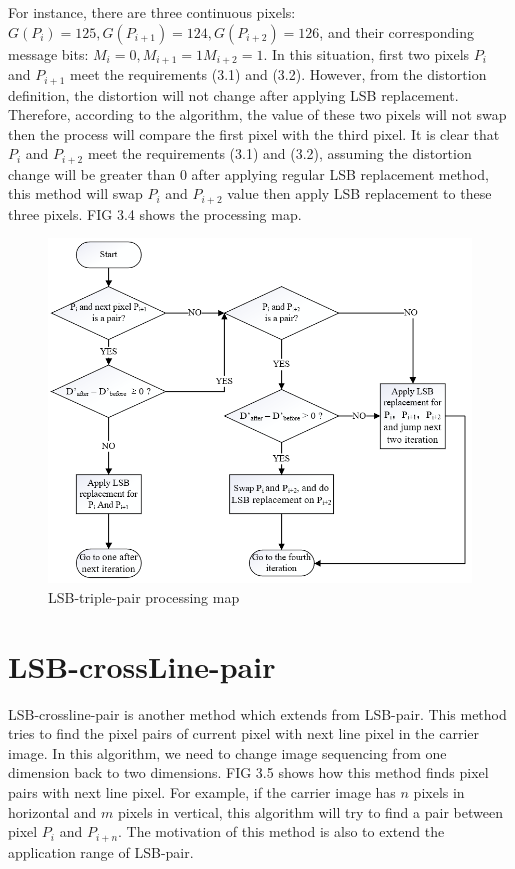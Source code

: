 For instance, there are three continuous pixels: \(G(P_{i}) = 125, G(P_{i+1}) = 124, G(P_{i+2}) = 126\), and their corresponding message bits: \(M_{i} = 0, M_{i+1} = 1 M_{i+2} = 1\). In this situation, first two pixels \(P_{i}\) and \(P_{i+1}\) meet the requirements (3.1) and (3.2). However, from the distortion definition, the distortion will not change after applying LSB replacement. Therefore, according to the algorithm, the value of these two pixels will not swap then the process will compare the first pixel with the third pixel. It is clear that \(P_{i}\) and \(P_{i+2}\) meet the requirements (3.1) and (3.2), assuming the distortion change will be greater than 0 after applying regular LSB replacement method, this method will swap \(P_{i}\) and \(P_{i+2}\) value then apply LSB replacement to these three pixels. FIG 3.4 shows the processing map.


\begin{figure}[h]
\includegraphics[width=\columnwidth]{image/processing_map_triple.PNG}
\caption{LSB-triple-pair processing map}
\label{fig:figure}
\end{figure}    




\section{\label{sec:level1}LSB-crossLine-pair}

LSB-crossline-pair is another method which extends from LSB-pair. This method tries to find the pixel pairs of current pixel with next line pixel in the carrier image. In this algorithm, we need to change image sequencing from one dimension back to two dimensions. FIG 3.5 shows how this method finds pixel pairs with next line pixel. For example, if the carrier image has \(n\) pixels in horizontal and \(m\) pixels in vertical, this algorithm will try to find a pair between pixel \(P_{i}\) and \(P_{i+n}\). The motivation of this method is also to extend the application range of LSB-pair.  

